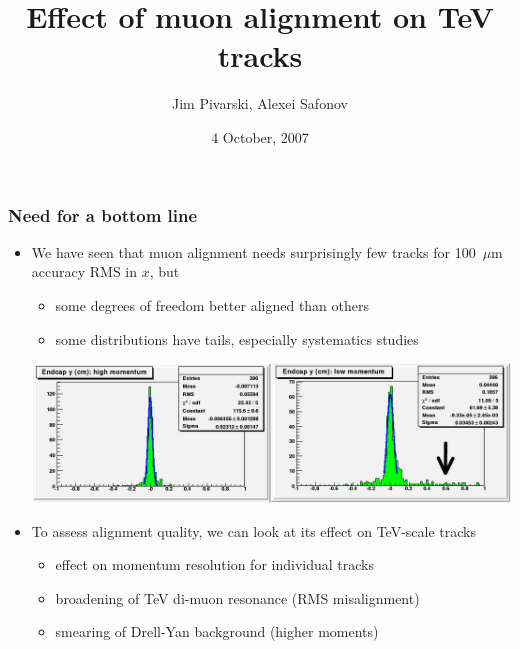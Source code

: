 \documentclass[compress]{beamer}
\title{Effect of muon alignment on TeV tracks}
\author{Jim Pivarski, Alexei Safonov}
\institute{Texas A\&M University}
\date{ 4 October, 2007}
\begin{document}
\frame{\titlepage}










\begin{frame}
\frametitle{Need for a bottom line}
\begin{itemize}
\item We have seen that muon alignment needs surprisingly few tracks
for 100~$\mu$m accuracy RMS in $x$, but
\begin{itemize}
\item some degrees of freedom better aligned than others
\item some distributions have tails, especially systematics studies
\end{itemize}
\begin{center}
\includegraphics[width=0.9\linewidth]{momentum_accuracy.png}
\end{center}
\item To assess alignment quality, we can look at its effect on TeV-scale tracks
\begin{itemize}
\item effect on momentum resolution for individual tracks
\item broadening of TeV di-muon resonance (RMS misalignment)
\item smearing of Drell-Yan background (higher moments)
\end{itemize}
\end{itemize}
\end{frame}
\end{document}
